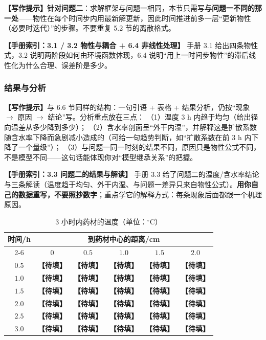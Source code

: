 \documentclass[12pt,a4paper]{article}
\newcommand{\prompt}[1]{\par\noindent\textbf{【写作提示】}#1\par}      %
\newcommand{\ph}[1]{\textbf{【#1】}}                                   %
\newcommand{\handbook}[2]{\par\noindent\textbf{【手册索引：#1】} #2\par}
\begin{document}
\prompt{\textbf{针对问题二}：求解框架与问题一相同，本节只需写\textbf{与问题一不同的那一处}——物性在每个时间步内用最新解更新，因此时间推进前多一层“更新物性（必要时迭代）”的步骤。不要重复 5.2 节的离散格式。}

\handbook{3.1 / 3.2 物性与耦合 + 6.4 非线性处理}{手册 3.1 给出四条物性式，3.2 说明两阶段如何由环境函数体现，6.4 说明“用上一时间步物性”的滞后线性化为什么合理、误差阶是多少。}

\subsubsection{结果与分析}

\prompt{与 6.6 节同样的结构：一句引语 + 表格 + 结果分析，仍按“现象 $\rightarrow$ 原因 $\rightarrow$ 结论”写。分析重点放在三点：
（1）温度 3 h 内趋于均匀（给出径向温差从多少降到多少）；
（2）含水率剖面呈“外干内湿”，并解释这是扩散系数随含水率下降而急剧减小造成的（可给一句趋势判断，如“扩散系数在前 3 h 内下降了一个量级”）；
（3）与问题一同一时刻的结果不同，原因只是物性公式不同，不是模型不同——这句话能体现你对“模型继承关系”的把握。}

\handbook{3.3 问题二的结果与解读}{手册 3.3 给了问题二的温度/含水率结论与三条解读（温度趋于均匀、外干内湿、与问题一差异只来自物性公式）。\textbf{用你自己的数据重写，不要照抄数字}；重点学它的解释方式：每条现象后面都跟一个机理原因。}

\begin{table}[H]
\centering
\caption{3 小时内药材的温度（单位：$^\circ$C）}
\label{tab:q2-temperature}
\begin{tabular}{cccccc}
\toprule
\multirow{2}{*}{时间/h} & \multicolumn{5}{c}{到药材中心的距离/cm}\\
\cmidrule(lr){2-6}
 & $0$ & $0.5$ & $1.0$ & $1.5$ & $2.0$\\
\midrule
$0.5$ & \ph{待填} & \ph{待填} & \ph{待填} & \ph{待填} & \ph{待填}\\
$1.0$ & \ph{待填} & \ph{待填} & \ph{待填} & \ph{待填} & \ph{待填}\\
$1.5$ & \ph{待填} & \ph{待填} & \ph{待填} & \ph{待填} & \ph{待填}\\
$2.0$ & \ph{待填} & \ph{待填} & \ph{待填} & \ph{待填} & \ph{待填}\\
$2.5$ & \ph{待填} & \ph{待填} & \ph{待填} & \ph{待填} & \ph{待填}\\
$3.0$ & \ph{待填} & \ph{待填} & \ph{待填} & \ph{待填} & \ph{待填}\\
\bottomrule
\end{tabular}
\end{table}
\end{document}
